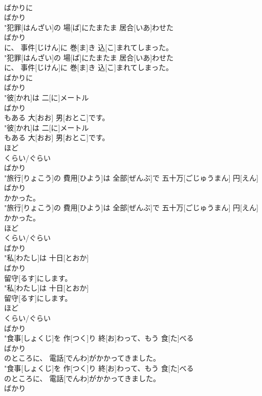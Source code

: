 \documentclass[8pt]{extreport}
\begin{document}
\begin{CJK}{UTF8}{min}
\\	ばかりに	
\\	ばかり
\\	"犯罪[はんざい]の 場[ば]にたまたま 居合[いあ]わせた
\\	ばかり
\\	に、 事件[じけん]に 巻[ま]き 込[こ]まれてしまった。
\\	"犯罪[はんざい]の 場[ば]にたまたま 居合[いあ]わせた
\\	に、 事件[じけん]に 巻[ま]き 込[こ]まれてしまった。
\\	ばかりに	
\\	ばかり
\\	"彼[かれ]は 二[に]メートル
\\	ばかり
\\	もある 大[おお] 男[おとこ]です。
\\	"彼[かれ]は 二[に]メートル
\\	もある 大[おお] 男[おとこ]です。
\\	ほど 
\\	くらい/ぐらい 
\\	ばかり
\\	"旅行[りょこう]の 費用[ひよう]は 全部[ぜんぶ]で 五十万[ごじゅうまん] 円[えん]
\\	ばかり
\\	かかった。
\\	"旅行[りょこう]の 費用[ひよう]は 全部[ぜんぶ]で 五十万[ごじゅうまん] 円[えん]
\\	かかった。
\\	ほど 
\\	くらい/ぐらい 
\\	ばかり
\\	"私[わたし]は 十日[とおか]
\\	ばかり
\\	留守[るす]にします。
\\	"私[わたし]は 十日[とおか]
\\	留守[るす]にします。
\\	ほど 
\\	くらい/ぐらい 
\\	ばかり
\\	"食事[しょくじ]を 作[つく]り 終[お]わって、もう 食[た]べる
\\	ばかり
\\	のところに、 電話[でんわ]がかかってきました。
\\	"食事[しょくじ]を 作[つく]り 終[お]わって、もう 食[た]べる
\\	のところに、 電話[でんわ]がかかってきました。
\\	ばかり

\end{CJK}
\end{document}
